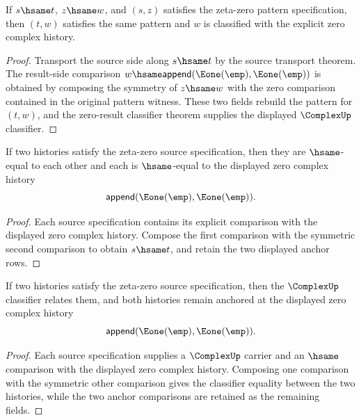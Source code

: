 \begin{theorem}
\label{thm:zeta-zero-pattern-spec-hsame-transport-classifier}
If \(s\hsame t\), \(z\hsame w\), and \((s,z)\) satisfies the zeta-zero pattern
specification, then \((t,w)\) satisfies the same pattern and \(w\) is classified
with the explicit zero complex history.
\end{theorem}
\begin{proof}
Transport the source side along \(s\hsame t\) by the source transport theorem.
The result-side comparison \(w\hsame\mathsf{append}(\Eone(\emp),\Eone(\emp))\)
is obtained by composing the symmetry of \(z\hsame w\) with the zero comparison
contained in the original pattern witness. These two fields rebuild the pattern
for \((t,w)\), and the zero-result classifier theorem supplies the displayed
\(\ComplexUp\) classifier.
\end{proof}

\begin{theorem}
\label{thm:zeta-zero-source-spec-zero-anchor-unique}
If two histories satisfy the zeta-zero source specification, then they are
\(\hsame\)-equal to each other and each is \(\hsame\)-equal to the displayed
zero complex history
$$
\mathsf{append}(\Eone(\emp),\Eone(\emp)).
$$
\end{theorem}
\begin{proof}
Each source specification contains its explicit comparison with the displayed
zero complex history. Compose the first comparison with the symmetric second
comparison to obtain \(s\hsame t\), and retain the two displayed anchor rows.
\end{proof}

\begin{theorem}
\label{thm:zeta-zero-source-spec-pair-classifier}
If two histories satisfy the zeta-zero source specification, then the
\(\ComplexUp\) classifier relates them, and both histories remain anchored at
the displayed zero complex history
$$
\mathsf{append}(\Eone(\emp),\Eone(\emp)).
$$
\end{theorem}
\begin{proof}
Each source specification supplies a \(\ComplexUp\) carrier and an \(\hsame\)
comparison with the displayed zero complex history. Composing one comparison
with the symmetric other comparison gives the classifier equality between the
two histories, while the two anchor comparisons are retained as the remaining
fields.
\end{proof}

